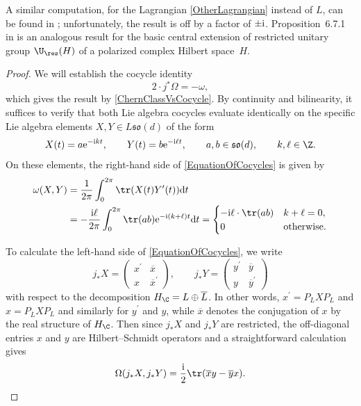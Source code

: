 A similar computation, for the Lagrangian \eqref{OtherLagrangian} instead of $L$, can be found in \cite{KristelWaldorf1}; unfortunately, the result is off by a factor of $\pm {\rm i}$.
Proposition~6.7.1 in \cite{PressleySegal} is an analogous result for the basic central extension of restricted unitary group $\U_{\res}(H)$ of a polarized complex Hilbert space~$H$.

\begin{proof}We will establish the cocycle identity
\begin{equation}\label{EquationOfCocycles}
 2 \cdot j^*\Omega = -\omega,	
\end{equation}
which gives the result by \eqref{ChernClassVsCocycle}.
By continuity and bilinearity, it suffices to verify that both Lie algebra cocycles evaluate identically on the specific Lie algebra elements $X,Y \in L\mathfrak{so}(d)$ of the form
\begin{equation*}
	X(t) = a {\rm e}^{-{\rm i}kt}, \qquad Y(t) = b {\rm e}^{-{\rm i}\ell t}, \qquad a, b \in \mathfrak{so}(d), \qquad k, \ell \in \Z.
\end{equation*}
On these elements, the right-hand side of \eqref{EquationOfCocycles} is given by
\begin{align}
 \omega(X, Y) &= \frac{1}{2\pi}\int_0^{2\pi} \tr(X(t) Y^\prime(t)) {\rm d}t
 \nonumber\\
 &= -\frac{{\rm i}\ell}{2\pi}\int_0^{2\pi} \tr(ab) {\rm e}^{-{\rm i}(k+\ell)t} {\rm d}t
 = \begin{cases} -{\rm i}\ell \cdot \tr(ab) & k+\ell = 0, \\ 0 & \text{otherwise}.
 \end{cases}\label{ToCompareWithOmega}
\end{align}

To calculate the left-hand side of \eqref{EquationOfCocycles}, we write
	\begin{equation*}
 j_*X =
 \begin{pmatrix}
 	x^\prime & \overline{x} \\ x & \overline{x}^\prime
 \end{pmatrix},	
 \qquad
 j_*Y =
 \begin{pmatrix}
 	y^\prime & \overline{y} \\ y & \overline{y}^\prime
 \end{pmatrix}	
\end{equation*}
with respect to the decomposition $H_\C = L \oplus \overline{L}$.
In other words, $x^\prime = P_LXP_L$ and $x = P_{\overline{L}}XP_L$ and similarly for $y^\prime$ and $y$, while $\overline{x}$ denotes the conjugation of $x$ by the real structure of $H_\C$.
Then since $j_*X$ and $j_*Y$ are restricted, the off-diagonal entries $x$ and $y$ are Hilbert--Schmidt operators and a straightforward calculation gives
\begin{equation}
\label{ReformulatedOmega}
 \Omega(j_*X, j_*Y) = \frac{{\rm i}}{2} \tr(\overline{x} y - \overline{y}x).	
\end{equation}


\end{proof}
